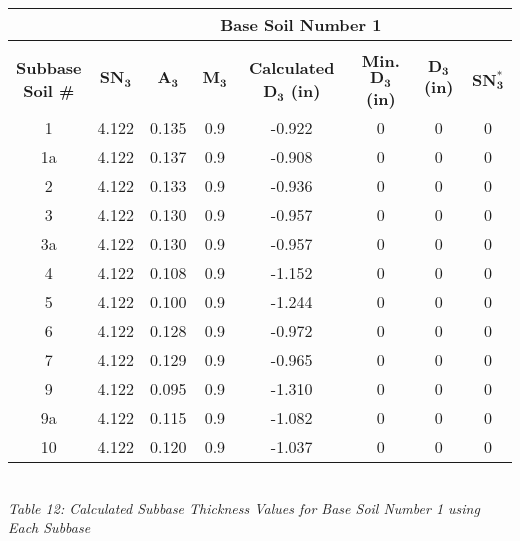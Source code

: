 \documentclass{article}
\begin{document}
\begin{center}
\begin{spacing}{1.6}
        \begin{tabular}{|c|ccccccc|}
            \hline    
            \multicolumn{1}{|l}{}                     & \multicolumn{7}{c|}{\textbf{Base Soil Number 1}}                                              \\\hline
            &&&&&&&\\
             \shortstack[c]{\textbf{Subbase}\\\textbf{Soil \#}} & $\bm{SN_3}$ & $\bm{A_3}$ & $\bm{M_3}$ & \textbf{Calculated $\bm{D_3}$ (in)} & \textbf{Min. $\bm{D_3}$ (in)} & \textbf{$\bm{D_3}$ (in)} & $\bm{SN_3^*}$  \\\hline
                                            1  & 4.122 & 0.135 & 0.9 & -0.922 & 0 & 0 &0 \\
                                            1a & 4.122 & 0.137 & 0.9 & -0.908 & 0 & 0 &0 \\
                                            2  & 4.122 & 0.133 & 0.9 & -0.936 & 0 & 0 &0 \\
                                            3  & 4.122 & 0.130 & 0.9 & -0.957 & 0 & 0 &0 \\
                                            3a & 4.122 & 0.130 & 0.9 & -0.957 & 0 & 0 &0 \\
                                            4  & 4.122 & 0.108 & 0.9 & -1.152 & 0 & 0 &0 \\
                                            5  & 4.122 & 0.100 & 0.9 & -1.244 & 0 & 0 &0 \\
                                            6  & 4.122 & 0.128 & 0.9 & -0.972 & 0 & 0 &0 \\
                                            7  & 4.122 & 0.129 & 0.9 & -0.965 & 0 & 0 &0 \\
                                            9  & 4.122 & 0.095 & 0.9 & -1.310 & 0 & 0 &0 \\
                                            9a & 4.122 & 0.115 & 0.9 & -1.082 & 0 & 0 &0 \\
                                            10 & 4.122 & 0.120 & 0.9 & -1.037 & 0 & 0 &0\\\hline
        \end{tabular}
        \vspace{3mm}
        \emph{\\Table 12: Calculated Subbase Thickness Values for Base Soil Number 1 using Each Subbase}

\end{spacing}
\end{center}
\end{document}
